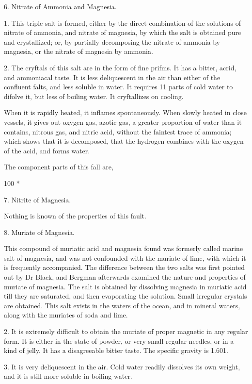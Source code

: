 \documentclass{article}
\begin{document}
6. Nitrate of Ammonia and Magnesia.

1. This triple salt is formed, either by the direct combination of the solutions of nitrate of ammonia, and nitrate of magnesia, by which the salt is obtained pure and crystallized; or, by partially decomposing the nitrate of ammonia by magnesia, or the nitrate of magnesia by ammonia.

2. The cryftals of this salt are in the form of fine prifms. It has a bitter, acrid, and ammoniacal taste. It is less deliquescent in the air than either of the confluent falts, and less soluble in water. It requires 11 parts of cold water to difolve it, but less of boiling water. It cryftallizes on cooling.

When it is rapidly heated, it inflames spontaneously. When slowly heated in close vessels, it gives out oxygen gas, azotic gas, a greater proportion of water than it contains, nitrous gas, and nitric acid, without the faintest trace of ammonia; which shows that it is decomposed, that the hydrogen combines with the oxygen of the acid, and forms water.

The component parts of this fall are,

100 *

7. Nitrite of Magnesia.

Nothing is known of the properties of this fault.

8. Muriate of Magnesia.

This compound of muriatic acid and magnesia found was formerly called marine salt of magnesia, and was not confounded with the muriate of lime, with which it is frequently accompanied. The difference between the two salts was first pointed out by Dr Black, and Bergman afterwards examined the nature and properties of muriate of magnesia. The salt is obtained by dissolving magnesia in muriatic acid till they are saturated, and then evaporating the solution. Small irregular crystals are obtained. This salt exists in the waters of the ocean, and in mineral waters, along with the muriates of soda and lime.

2. It is extremely difficult to obtain the muriate of proper magnetic in any regular form. It is either in the state of powder, or very small regular needles, or in a kind of jelly. It has a disagreeable bitter taste. The specific gravity is 1.601.

3. It is very deliquescent in the air. Cold water readily dissolves its own weight, and it is still more soluble in boiling water.
\end{document}
